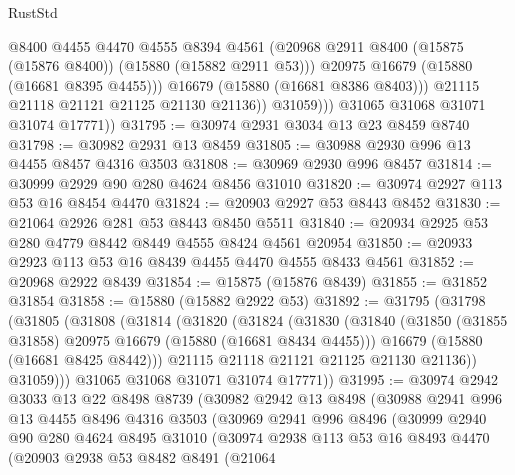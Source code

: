\begin{lexlean}{RustStd}
\begin{coremodule}
                      @8400
                      @4455
                      @4470
                      @4555
                      @8394
                      @4561
                      (@20968 @2911 @8400 (@15875 (@15876 @8400)) (@15880 (@15882 @2911 @53)))
                      @20975
                      @16679
                      (@15880 (@16681 @8395 @4455)))
                    @16679
                    (@15880 (@16681 @8386 @8403)))
                  @21115
                  @21118
                  @21121
                  @21125
                  @21130
                  @21136))
              @31059)))
        @31065
        @31068
        @31071
        @31074
        @17771))
@31795 := @30974 @2931 @3034 @13 @23 @8459 @8740
@31798 := @30982 @2931 @13 @8459
@31805 := @30988 @2930 @996 @13 @4455 @8457 @4316 @3503
@31808 := @30969 @2930 @996 @8457
@31814 := @30999 @2929 @90 @280 @4624 @8456 @31010
@31820 := @30974 @2927 @113 @53 @16 @8454 @4470
@31824 := @20903 @2927 @53 @8443 @8452
@31830 := @21064 @2926 @281 @53 @8443 @8450 @5511
@31840 := @20934 @2925 @53 @280 @4779 @8442 @8449 @4555 @8424 @4561 @20954
@31850 := @20933 @2923 @113 @53 @16 @8439 @4455 @4470 @4555 @8433 @4561
@31852 := @20968 @2922 @8439
@31854 := @15875 (@15876 @8439)
@31855 := @31852 @31854
@31858 := @15880 (@15882 @2922 @53)
@31892 := @31795
    (@31798
      (@31805
        (@31808
          (@31814
            (@31820
              (@31824
                (@31830
                  (@31840
                    (@31850 (@31855 @31858) @20975 @16679 (@15880 (@16681 @8434 @4455)))
                    @16679
                    (@15880 (@16681 @8425 @8442)))
                  @21115
                  @21118
                  @21121
                  @21125
                  @21130
                  @21136))
              @31059)))
        @31065
        @31068
        @31071
        @31074
        @17771))
@31995 := @30974
    @2942
    @3033
    @13
    @22
    @8498
    @8739
    (@30982
      @2942
      @13
      @8498
      (@30988
        @2941
        @996
        @13
        @4455
        @8496
        @4316
        @3503
        (@30969
          @2941
          @996
          @8496
          (@30999
            @2940
            @90
            @280
            @4624
            @8495
            @31010
            (@30974
              @2938
              @113
              @53
              @16
              @8493
              @4470
              (@20903
                @2938
                @53
                @8482
                @8491
                (@21064

\end{coremodule}
\end{lexlean}
